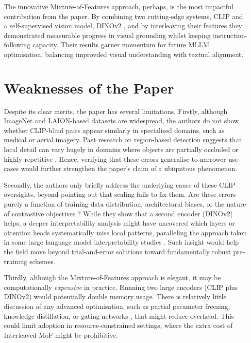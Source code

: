 \documentclass[11pt]{article}
\begin{document}
The innovative Mixture-of-Features approach, perhaps, is the most impactful contribution from the paper. By combining two cutting-edge systems, CLIP \cite{Radford2021ICML} and a self-supervised vision model, DINOv2 \cite{Oquab2023DINOv2}, and by interleaving their features they demonstrated measurable progress in visual grounding whilst keeping instruction-following capacity.
Their results garner momentum for future MLLM optimisation, balancing improvded visual understanding with textual alignment.

\section*{Weaknesses of the Paper}
Despite its clear merits, the paper has several limitations. Firstly, although ImageNet and LAION-based datasets are widespread, the authors do not show whether CLIP-blind pairs appear similarly in specialised domains, such as medical or aerial imagery. Past research on region-based detection suggests that local detail can vary hugely in domains where objects are partially occluded or highly repetitive \cite{Girshick2014CVPR}. Hence, verifying that these errors generalise to narrower use-cases would further strengthen the paper's claim of a ubiquitous phenomenon.

Secondly, the authors only briefly address the underlying cause of these CLIP oversights, beyond pointing out that scaling fails to fix them. Are these errors purely a function of training data distribution, architectural biases, or the nature of contrastive objectives \cite{Radford2021ICML}? While they show that a second encoder (DINOv2) helps, a deeper interpretability analysis might have uncovered which layers or attention heads systematically miss local patterns, paralleling the approach taken in some large language model interpretability studies \cite{Devlin2019NAACL_BERT}. Such insight would help the field move beyond trial-and-error solutions toward fundamentally robust pre-training schemes.

Thirdly, although the Mixture-of-Features approach is elegant, it may be computationally \emph{expensive} in practice. Running two large encoders (CLIP plus DINOv2) would potentially double memory usage. There is relatively little discussion of any advanced optimisation, such as partial parameter freezing, knowledge distillation, or gating networks \cite{Li2023ICML_BLIP2}, that might reduce overhead. This could limit adoption in resource-constrained settings, where the extra cost of Interleaved-MoF might be prohibitive.
\end{document}
